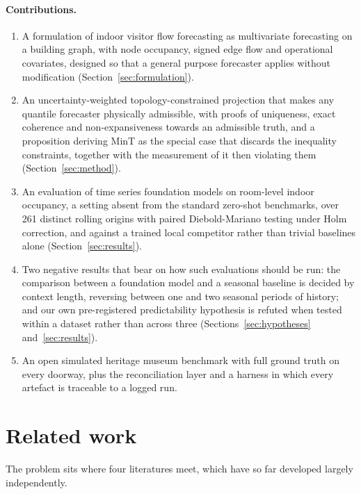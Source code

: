 \documentclass[11pt]{article}
\theoremstyle{plain}
\theoremstyle{definition}
\theoremstyle{remark}
\begin{document}
\paragraph{Contributions.}
\begin{enumerate}\itemsep2pt
\item A formulation of indoor visitor flow forecasting as multivariate forecasting on a building graph, with node occupancy, signed edge flow and operational covariates, designed so that a general purpose forecaster applies without modification (Section~\ref{sec:formulation}).
\item An uncertainty-weighted topology-constrained projection that makes any quantile forecaster physically admissible, with proofs of uniqueness, exact coherence and non-expansiveness towards an admissible truth, and a proposition deriving MinT as the special case that discards the inequality constraints, together with the measurement of it then violating them (Section~\ref{sec:method}).
\item An evaluation of time series foundation models on room-level indoor occupancy, a setting absent from the standard zero-shot benchmarks, over \num{261} distinct rolling origins with paired Diebold-Mariano testing under Holm correction, and against a trained local competitor rather than trivial baselines alone (Section~\ref{sec:results}).
\item Two negative results that bear on how such evaluations should be run: the comparison between a foundation model and a seasonal baseline is decided by context length, reversing between one and two seasonal periods of history; and our own pre-registered predictability hypothesis is refuted when tested within a dataset rather than across three (Sections~\ref{sec:hypotheses} and~\ref{sec:results}).
\item An open simulated heritage museum benchmark with full ground truth on every doorway, plus the reconciliation layer and a harness in which every artefact is traceable to a logged run.
\end{enumerate}

\section{Related work}
\label{sec:related}

The problem sits where four literatures meet, which have so far developed largely independently.
\end{document}
